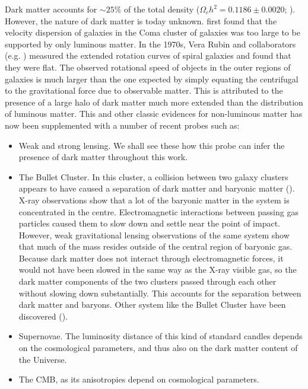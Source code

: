 Dark matter accounts for $\sim 25\%$ of the total density ($\Omega_{c}h^2=0.1186\pm0.0020$; \citealt{planck16}). However, the nature of dark matter is today unknown. \citet{zwicky} first found that the velocity dispersion of galaxies in the Coma cluster of galaxies was too large to be supported by only luminous matter. In the 1970s, Vera Rubin and collaborators (e.g. \citealt{1970ApJ...159..379R}) measured the extended rotation curves of spiral galaxies and found that they were flat. The observed rotational speed of objects in the outer regions of galaxies is much larger than the one expected by simply equating the centrifugal to the gravitational force due to observable matter. This is attributed to the presence of a large halo of dark matter much more extended than the distribution of luminous matter. This and other classic evidences for non-luminous matter has now been supplemented with a number of recent probes such as:
\begin{itemize}
\item Weak and strong lensing. We shall see these how this probe can infer the presence of dark matter throughout this work.
\item The Bullet Cluster. In this cluster, a collision between two galaxy clusters appears to have caused a separation of dark matter and baryonic matter (\citealt{2002ApJ...567L..27M}). X-ray observations show that a lot of the baryonic matter in the system is concentrated in the centre. Electromagnetic interactions between passing gas particles caused them to slow down and settle near the point of impact. However, weak gravitational lensing observations of the same system show that much of the mass resides outside of the central region of baryonic gas. Because dark matter does not interact through electromagnetic forces, it would not have been slowed in the same way as the X-ray visible gas, so the dark matter components of the two clusters passed through each other without slowing down substantially. This accounts for the separation between dark matter and baryons. Other system like the Bullet Cluster have been discovered (\citealt{2007ApJ...664..162M}).
\item Supernovae. The luminosity distance of this kind of standard candles depends on the cosmological parameters, and thus also on the dark matter content of the Universe.
\item The CMB, as its anisotropies depend on cosmological parameters.
\end{itemize}

